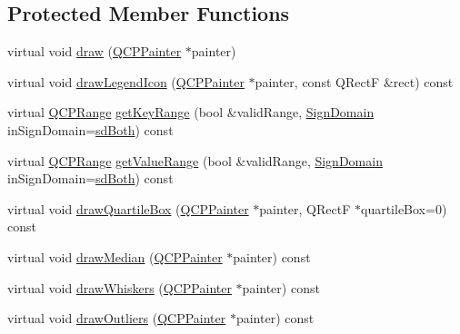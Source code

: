 \subsection*{Protected Member Functions}
\begin{DoxyCompactItemize}
\item 
virtual void \hyperlink{class_q_c_p_statistical_box_a753b62761217dd6b92f8a29e286a1317}{draw} (\hyperlink{class_q_c_p_painter}{Q\-C\-P\-Painter} $\ast$painter)
\item 
virtual void \hyperlink{class_q_c_p_statistical_box_a51764ed423fa02d3ef63f6848851ec33}{draw\-Legend\-Icon} (\hyperlink{class_q_c_p_painter}{Q\-C\-P\-Painter} $\ast$painter, const Q\-Rect\-F \&rect) const 
\item 
virtual \hyperlink{class_q_c_p_range}{Q\-C\-P\-Range} \hyperlink{class_q_c_p_statistical_box_a2f66940ae92d7ad438834c861fc2d57f}{get\-Key\-Range} (bool \&valid\-Range, \hyperlink{class_q_c_p_abstract_plottable_a661743478a1d3c09d28ec2711d7653d8}{Sign\-Domain} in\-Sign\-Domain=\hyperlink{class_q_c_p_abstract_plottable_a661743478a1d3c09d28ec2711d7653d8a082b98cfb91a7363a3b5cd17b0c1cd60}{sd\-Both}) const 
\item 
virtual \hyperlink{class_q_c_p_range}{Q\-C\-P\-Range} \hyperlink{class_q_c_p_statistical_box_a2db77e9a3c2cc016381340968a250be0}{get\-Value\-Range} (bool \&valid\-Range, \hyperlink{class_q_c_p_abstract_plottable_a661743478a1d3c09d28ec2711d7653d8}{Sign\-Domain} in\-Sign\-Domain=\hyperlink{class_q_c_p_abstract_plottable_a661743478a1d3c09d28ec2711d7653d8a082b98cfb91a7363a3b5cd17b0c1cd60}{sd\-Both}) const 
\item 
virtual void \hyperlink{class_q_c_p_statistical_box_a9ad0abdb154fefb04e9872f0db8e2ec7}{draw\-Quartile\-Box} (\hyperlink{class_q_c_p_painter}{Q\-C\-P\-Painter} $\ast$painter, Q\-Rect\-F $\ast$quartile\-Box=0) const 
\item 
virtual void \hyperlink{class_q_c_p_statistical_box_a16fef8bc19e5a09d82033edcfe919495}{draw\-Median} (\hyperlink{class_q_c_p_painter}{Q\-C\-P\-Painter} $\ast$painter) const 
\item 
virtual void \hyperlink{class_q_c_p_statistical_box_a6f8d093ec7e404529388d02da4c72b34}{draw\-Whiskers} (\hyperlink{class_q_c_p_painter}{Q\-C\-P\-Painter} $\ast$painter) const 
\item 
virtual void \hyperlink{class_q_c_p_statistical_box_a60ebb332a497f51ace837767db5105b9}{draw\-Outliers} (\hyperlink{class_q_c_p_painter}{Q\-C\-P\-Painter} $\ast$painter) const 
\end{DoxyCompactItemize}
